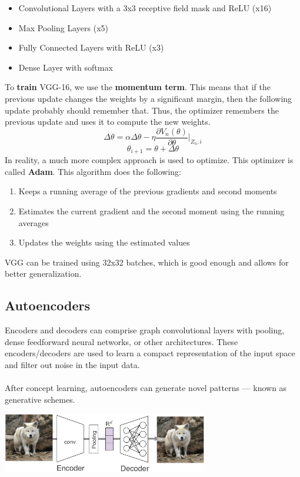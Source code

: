 \documentclass{article}
\begin{document}
\begin{itemize}
	\item Convolutional Layers with a 3x3 receptive field mask and ReLU (x16)
	\item Max Pooling Layers (x5)
	\item Fully Connected Layers with ReLU (x3)
	\item Dense Layer with softmax
\end{itemize}
To \textbf{train} VGG-16, we use the \textbf{momentum term}. This means that if the previous update changes the weights by a significant margin, then the following update probably should remember that. Thus, the optimizer remembers the previous update and uses it to compute the new weights.
\[ \Delta\theta = \alpha\Delta\theta - \eta\displaystyle\frac{\partial V_n(\theta)}{\partial\theta}\Bigg|_{Z_n,i} \]
\[ \theta_{i+1} = \theta + \Delta\theta \]
In reality, a much more complex approach is used to optimize. This optimizer is called \textbf{Adam}. This algorithm does the following:

\begin{enumerate}
	\item Keeps a running average of the previous gradients and second moments
	\item Estimates the current gradient and the second moment using the running averages
	\item Updates the weights using the estimated values
\end{enumerate}
VGG can be trained using 32x32 batches, which is good enough and allows for better generalization.

\subsection{Autoencoders}
Encoders and decoders can comprise graph convolutional layers with pooling, dense feedforward neural networks, or other architectures. These encoders/decoders are used to learn a compact representation of the input space and filter out noise in the input data. \\ \\
After concept learning, autoencoders can generate novel patterns — known as generative schemes.

\begin{center}
	\includegraphics[width=9cm]{assets/encoders.png}
\end{center}
\end{document}
